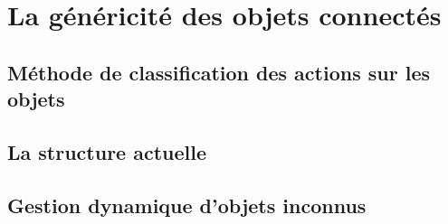\section{La généricité des objets connectés}
	\subsection{Méthode de classification des actions sur les objets}
	\subsection{La structure actuelle}
	\subsection{Gestion dynamique d’objets inconnus}

